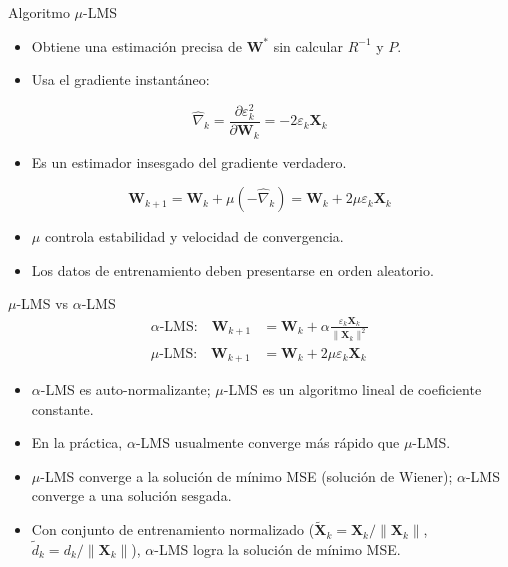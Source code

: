 \documentclass[aspectratio=169,utf8,spanish]{beamer}
\begin{document}
\begin{frame}{Algoritmo $\mu$-LMS}
  \begin{itemize}
    \item Obtiene una estimación precisa de $\mathbf{W}^*$ sin calcular $R^{-1}$ y $P$.
    \item Usa el gradiente instantáneo:
  \end{itemize}

  \begin{equation*}
    \hat{\nabla}_k = \frac{\partial \varepsilon_k^2}{\partial \mathbf{W}_k} = -2\varepsilon_k\mathbf{X}_k
  \end{equation*}

  \begin{itemize}
    \item Es un estimador insesgado del gradiente verdadero.
  \end{itemize}

  \begin{equation*}
    \mathbf{W}_{k+1} = \mathbf{W}_k + \mu(-\hat{\nabla}_k) = \mathbf{W}_k + 2\mu\varepsilon_k\mathbf{X}_k
  \end{equation*}

  \begin{itemize}
    \item $\mu$ controla estabilidad y velocidad de convergencia.
    \item Los datos de entrenamiento deben presentarse en orden aleatorio.
  \end{itemize}
\end{frame}

\begin{frame}{$\mu$-LMS vs $\alpha$-LMS}
  \begin{align*}
    \alpha\text{-LMS:}\quad \mathbf{W}_{k+1} &= \mathbf{W}_k + \alpha \frac{\varepsilon_k\mathbf{X}_k}{\|\mathbf{X}_k\|^2} \\[4pt]
    \mu\text{-LMS:}\quad \mathbf{W}_{k+1} &= \mathbf{W}_k + 2\mu\varepsilon_k\mathbf{X}_k
  \end{align*}

  \begin{itemize}
    \item $\alpha$-LMS es auto-normalizante; $\mu$-LMS es un algoritmo lineal de coeficiente constante.
    \item En la práctica, $\alpha$-LMS usualmente converge más rápido que $\mu$-LMS.
    \item $\mu$-LMS converge a la solución de mínimo MSE (solución de Wiener); $\alpha$-LMS converge a una solución sesgada.
    \item Con conjunto de entrenamiento normalizado ($\tilde{\mathbf{X}}_k = \mathbf{X}_k/\|\mathbf{X}_k\|$, $\tilde{d}_k = d_k/\|\mathbf{X}_k\|$), $\alpha$-LMS logra la solución de mínimo MSE.
  \end{itemize}
\end{frame}
\end{document}
